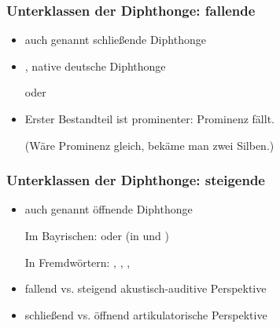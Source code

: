 \begin{frame}
\frametitle{Unterklassen der Diphthonge: fallende}
		
		\begin{itemize}
			
			\item auch genannt schließende Diphthonge 
			\item {}, native deutsche Diphthonge

			\ea {} oder 
			\z

			\item Erster Bestandteil ist prominenter: Prominenz fällt.\par
				(Wäre Prominenz gleich, bekäme man zwei Silben.)
				
			\end{itemize}
	
\end{frame}
\begin{frame}
\frametitle{Unterklassen der Diphthonge: steigende}		

		\begin{itemize}	
			\item auch genannt öffnende Diphthonge

			\ea Im Bayrischen: \textipa{[ \t{ɪa} , \t{ʊa} ]} oder  (in  und )
			\z
			
			\ea In Fremdwörtern: , , , 
			\z
			
			\item fallend vs. steigend \ras akustisch-auditive Perspektive
			\item schließend vs. öffnend \ras artikulatorische Perspektive
		\end{itemize}
		
\end{frame}


